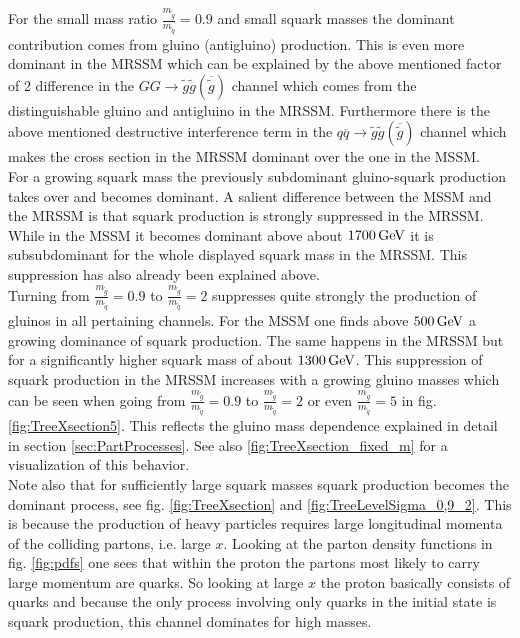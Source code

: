 For the small mass ratio $\frac{m_{\tilde{g}}}{m_{\tilde{q}}} = 0.9$ and small squark masses the dominant contribution comes from gluino (antigluino) production. This is even more dominant in the MRSSM which can be explained by the above mentioned factor of 2 difference in the $GG \to \tilde{g}\tilde{g}(\overline{\tilde{g}})$ channel which comes from the distinguishable gluino and antigluino in the MRSSM. Furthermore there is the above mentioned destructive interference term in the $q\overline{q} \to \tilde{g}\tilde{g}(\overline{\tilde{g}})$ channel which makes the cross section in the MRSSM dominant over the one in the MSSM.\\
For a growing squark mass the previously subdominant gluino-squark production takes over and becomes dominant. A salient difference between the MSSM and the MRSSM is that squark production is strongly suppressed in the MRSSM. While in the MSSM it becomes dominant above about $\unit[1700]{GeV}$ it is subsubdominant for the whole displayed squark mass in the MRSSM. This suppression has also already been explained above.\\
Turning from $\frac{m_{\tilde{g}}}{m_{\tilde{q}}} = 0.9$ to $\frac{m_{\tilde{g}}}{m_{\tilde{q}}} = 2$ suppresses quite strongly the production of gluinos in all pertaining channels. For the MSSM one finds above $\unit[500]{GeV}$ a growing dominance of squark production. The same happens in the MRSSM but for a significantly higher squark mass of about $\unit[1300]{GeV}$. This suppression of squark production in the MRSSM increases with a growing gluino masses which can be seen when going from $\frac{m_{\tilde{g}}}{m_{\tilde{q}}} = 0.9$ to  $\frac{m_{\tilde{g}}}{m_{\tilde{q}}} = 2$ or even  $\frac{m_{\tilde{g}}}{m_{\tilde{q}}} = 5$ in fig. \ref{fig:TreeXsection5}. This reflects the gluino mass dependence explained in detail in section \ref{sec:PartProcesses}. See also \ref{fig:TreeXsection_fixed_m} for a visualization of this behavior.\\
Note also that for sufficiently large squark masses squark production becomes the dominant process, see fig. \ref{fig:TreeXsection} and \ref{fig:TreeLevelSigma_0,9_2}. This is because the production of heavy particles requires large longitudinal momenta of the colliding partons, i.e. large $x$. Looking at the parton density functions in fig. \ref{fig:pdfs} one sees that within the proton the partons most likely to carry large momentum are quarks. So looking at large $x$ the proton basically consists of quarks and because the only process involving only quarks in the initial state is squark production, this channel dominates for high masses.\\
